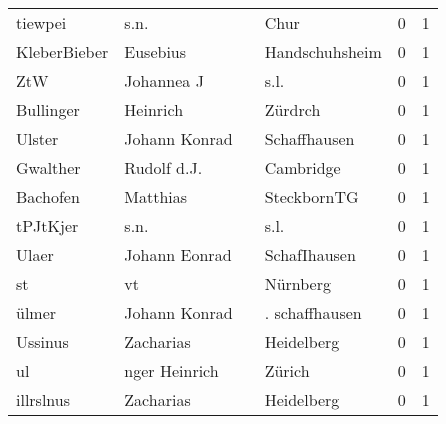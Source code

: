\begin{tabular}{llllrr}
                  tiewpei &                               s.n. &             &                                        Chur &          0 &         1 \\
             KleberBieber &                           Eusebius &             &                              Handschuhsheim &          0 &         1 \\
                      ZtW &                         Johannea J &             &                                        s.l. &          0 &         1 \\
                Bullinger &                           Heinrich &             &                                     Zürdrch &          0 &         1 \\
                   Ulster &                      Johann Konrad &             &                                Schaffhausen &          0 &         1 \\
                 Gwalther &                        Rudolf d.J. &             &                                   Cambridge &          0 &         1 \\
                 Bachofen &                           Matthias &             &                                 SteckbornTG &          0 &         1 \\
                 tPJtKjer &                               s.n. &             &                                        s.l. &          0 &         1 \\
                    Ulaer &                      Johann Eonrad &             &                                SchafIhausen &          0 &         1 \\
                       st &                                 vt &             &                                    Nürnberg &          0 &         1 \\
                    ülmer &                      Johann Konrad &             &                              . schaffhausen &          0 &         1 \\
                  Ussinus &                          Zacharias &             &                                  Heidelberg &          0 &         1 \\
                       ul &                      nger Heinrich &             &                                      Zürich &          0 &         1 \\
                illrslnus &                          Zacharias &             &                                  Heidelberg &          0 &         1 \\

\end{tabular}
